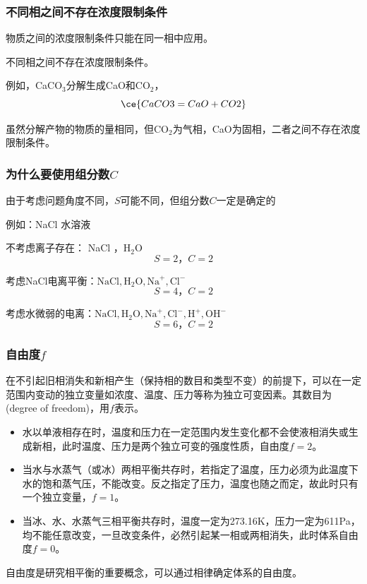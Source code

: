 \begin{frame}
    \frametitle{不同相之间不存在浓度限制条件}

    物质之间的浓度限制条件只能在同一相中应用。
    
    不同相之间不存在浓度限制条件。
    
    例如，CaCO$_3$分解生成CaO和CO$_2$，
    $$\ce{CaCO3 = CaO + CO2}$$
    
    虽然分解产物的物质的量相同，但CO$_2$为气相，CaO为固相，二者之间不存在浓度限制条件。

\end{frame}


\begin{frame}
    \frametitle{为什么要使用组分数$C$}

    由于考虑问题角度不同，$S$可能不同，但组分数$C$一定是确定的

    例如：NaCl 水溶液

    不考虑离子存在： NaCl ，H$_2$O
    $$S = 2\text{，} C = 2$$

    考虑NaCl电离平衡：$\mathrm{NaCl}, \mathrm{H}_{2} \mathrm{O}, \mathrm{Na}^{+}, \mathrm{Cl}^{-}$
    $$S = 4\text{，} C = 2$$

    考虑水微弱的电离：$\mathrm{NaCl}, \mathrm{H}_{2} \mathrm{O}, \mathrm{Na}^{+}, \mathrm{Cl}^{-}, \mathrm{H}^{+}, \mathrm{OH}^{-}$
    $$S = 6\text{，} C = 2$$

\end{frame}


\begin{frame}
    \frametitle{自由度$f$}

    在不引起旧相消失和新相产生（保持相的数目和类型不变）的前提下，可以在一定范围内变动的独立变量如浓度、温度、压力等称为独立可变因素。其数目为(degree of freedom)，用$f$表示。
    \begin{itemize}
        \item[\bullet] 水以单液相存在时，温度和压力在一定范围内发生变化都不会使液相消失或生成新相，此时温度、压力是两个独立可变的强度性质，自由度$f=2$。
        \item[\bullet] 当水与水蒸气（或冰）两相平衡共存时，若指定了温度，压力必须为此温度下水的饱和蒸气压，不能改变。反之指定了压力，温度也随之而定，故此时只有一个独立变量，$f=1$。
        \item[\bullet] 当冰、水、水蒸气三相平衡共存时，温度一定为273.16K，压力一定为611Pa，均不能任意改变，一旦改变条件，必然引起某一相或两相消失，此时体系自由度$f=0$。
    \end{itemize}
    
    自由度是研究相平衡的重要概念，可以通过相律确定体系的自由度。

\end{frame}


